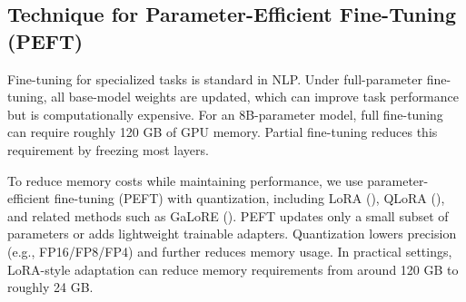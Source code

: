 \subsection*{Technique for Parameter-Efficient Fine-Tuning (PEFT)}

Fine-tuning for specialized tasks is standard in NLP. Under full-parameter fine-tuning, all base-model weights are updated, which can improve task performance but is computationally expensive. For an 8B-parameter model, full fine-tuning can require roughly 120 GB of GPU memory. Partial fine-tuning reduces this requirement by freezing most layers.


To reduce memory costs while maintaining performance, we use parameter-efficient fine-tuning (PEFT) with quantization, including LoRA (\cite{hu2021lora}), QLoRA (\cite{dettmers2024qlora}), and related methods such as GaLoRE (\cite{zhao2024galore}). PEFT updates only a small subset of parameters or adds lightweight trainable adapters. Quantization lowers precision (e.g., FP16/FP8/FP4) and further reduces memory usage. In practical settings, LoRA-style adaptation can reduce memory requirements from around 120 GB to roughly 24 GB.


